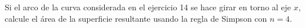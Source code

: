 \item Si el arco de la curva considerada en el ejercicio 14 se hace girar en torno al eje $x$, calcule el área de la superficie resultante usando la regla de Simpson con $n = 4$.
